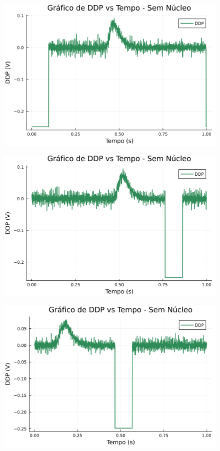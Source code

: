 \begin{center}
\begin{multicols}{2}
\begin{figure}[H]
    \centering
    \includegraphics[width=1.0\linewidth]{figuras/grafico_dados2_F0006CH1.png}
\end{figure}

\begin{figure}[H]
    \centering
    \includegraphics[width=1.0\linewidth]{figuras/grafico_dados2_F0007CH1.png}
\end{figure}

\begin{figure}[H]
    \centering
    \includegraphics[width=1.0\linewidth]{figuras/grafico_dados2_F0008CH1.png}
\end{figure}


\end{multicols}
\end{center}
